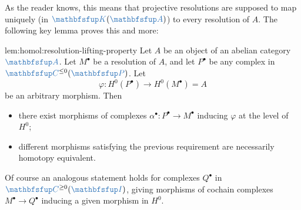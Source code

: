As the reader knows, this means that projective resolutions are
supposed to map uniquely (in $\categ{K}(\categ{A})$) to every
resolution of $A$. The following key lemma proves this and more:

\begin{lem}{}{lem:homol:resolution-lifting-property}
  Let $A$ be an object of an abelian category $\categ{A}$. Let
  $M^\bullet$ be a resolution of $A$, and let $P^\bullet$ be any
  complex in $\categ{C}^{\le 0}(\categ{P})$. Let
  \[
    \varphi : H^0(P^\bullet) \to H^0(M^\bullet) = A
  \]
  be an arbitrary morphism. Then
  \begin{itemize}
  \item there exist morphisms of complexes
    $\alpha^\bullet : P^\bullet \to M^\bullet$ inducing $\varphi$ at
    the level of $H^0$;
  \item different morphisms satisfying the previous requirement are
    necessarily homotopy equivalent.
  \end{itemize}
  Of course an analogous statement holds for complexes $Q^\bullet$ in
  $\categ{C}^{\ge 0}(\categ{I})$, giving morphisms of cochain
  complexes $M^\bullet \to Q^\bullet$ inducing a given morphism in
  $H^0$.
\end{lem}
